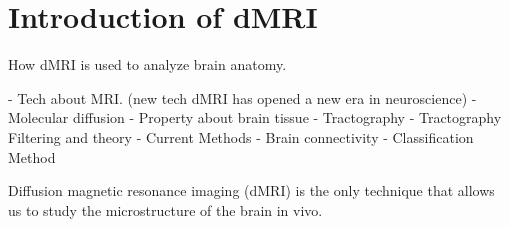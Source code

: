 \chapter*{Introduction of dMRI}

How dMRI is used to analyze brain anatomy.

- Tech about MRI. (new tech dMRI has opened a new era in neuroscience)
- Molecular diffusion
- Property about brain tissue
- Tractography
- Tractography Filtering and theory
- Current Methods
- Brain connectivity
- Classification Method




Diffusion magnetic resonance imaging (dMRI) is the only technique that allows us to study the microstructure of the brain in vivo. \cite{jonesInsightFundamentalTradeoffs2020}
